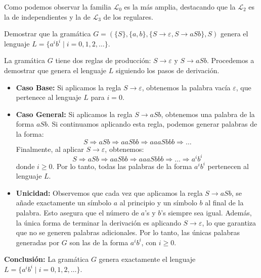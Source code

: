 \documentclass[12pt]{book} %
\begin{document}
Como podemos observar la familia \(\mathcal{L}_0\) es la más amplia,
destacando que la \(\mathcal{L}_2\) es la de independientes y la de
\(\mathcal{L}_3\) de los regulares.

\begin{ejercicioresuelto}
Demostrar que la gramática \( G = (\{S\}, \{a, b\}, \{S \to \varepsilon, S \to aSb\}, S) \) genera el lenguaje \( L = \{a^i b^i \mid i = 0, 1, 2, \ldots\} \).

\begin{demostracion}
La gramática \( G \) tiene dos reglas de producción: \( S \to \varepsilon \) y \( S \to aSb \). Procedemos a demostrar que genera el lenguaje \( L \) siguiendo los pasos de derivación.

\begin{itemize}
    \item \textbf{Caso Base:}  
    Si aplicamos la regla \( S \to \varepsilon \), obtenemos la palabra vacía \( \varepsilon \), que pertenece al lenguaje \( L \) para \( i = 0 \).

    \item \textbf{Caso General:}  
    Si aplicamos la regla \( S \to aSb \), obtenemos una palabra de la forma \( aSb \). Si continuamos aplicando esta regla, podemos generar palabras de la forma:
    \[
    S \Rightarrow aSb \Rightarrow aaSbb \Rightarrow aaaSbbb \Rightarrow \ldots
    \]
    Finalmente, al aplicar \( S \to \varepsilon \), obtenemos:
    \[
    S \Rightarrow aSb \Rightarrow aaSbb \Rightarrow aaaSbbb \Rightarrow \ldots \Rightarrow a^i b^i
    \]
    donde \( i \geq 0 \). Por lo tanto, todas las palabras de la forma \( a^i b^i \) pertenecen al lenguaje \( L \).

    \item \textbf{Unicidad:}  
    Observemos que cada vez que aplicamos la regla \( S \to aSb \), se añade exactamente un símbolo \( a \) al principio y un símbolo \( b \) al final de la palabra. Esto asegura que el número de \( a \)'s y \( b \)'s siempre sea igual. Además, la única forma de terminar la derivación es aplicando \( S \to \varepsilon \), lo que garantiza que no se generen palabras adicionales. Por lo tanto, las únicas palabras generadas por \( G \) son las de la forma \( a^i b^i \), con \( i \geq 0 \).
\end{itemize}

\textbf{Conclusión:} La gramática \( G \) genera exactamente el lenguaje \( L = \{a^i b^i \mid i = 0, 1, 2, \ldots\} \).
\end{demostracion}
\end{ejercicioresuelto}
\end{document}
